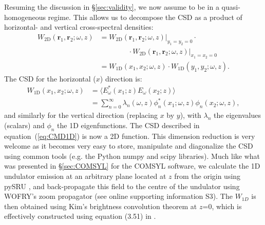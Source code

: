 \documentclass[preprint]{iucr}
\newcommand{\inred}[1]{{\color{red}#1}}
\begin{document}
Resuming the discussion in \S\ref{sec:validity}, we now assume to be in a quasi-homogeneous regime. This allow\inred{s} us to decompose the CSD as a product of horizontal- and vertical cross-spectral densities:
\begin{equation}\label{eq:CSD_2D_bis}
\begin{split}
W_\text{2D}(\textbf{r}_1,\textbf{r}_2;\omega,z) &= W_\text{2D}(\textbf{r}_1,\textbf{r}_2;\omega,z)\Big\rvert_{y_1=y_2=0} \cdot \\& \qquad\qquad\cdot W_\text{2D}(\textbf{r}_1,\textbf{r}_2;\omega,z)\Big\rvert_{x_1=x_2=0}\\
&= W_\text{1D}(x_1,x_2;\omega,z)\cdot W_\text{1D}(y_1,y_2;\omega,z).
\end{split}
\end{equation}
The CSD for the horizontal ($x$) direction is:
\begin{equation}\begin{split}
W_\text{1D}(x_1,x_2;\omega,z) &= \big\langle E^*_{\omega}(x_1;z) E_{\omega}(x_2;z)\big\rangle \\&=  \sum_{n=0}^{\infty} \lambda_n(\omega,z) \phi_n^*(x_1;\omega,z) \phi_n(x_2;\omega,z), 
\end{split}\label{eq:CMD1D}
\end{equation}
and similarly for the vertical direction (replacing $x$ by $y$), 
with $\lambda_n$ the eigenvalues (scalars) and $\phi_n$ the 1D eigenfunctions. The CSD described in equation~(\ref{eq:CMD1D}) is now a 2D function. This \inred{ dimension reduction} is very welcome as it becomes very easy to store, manipulate and diagonalize the CSD using common tools (e.g. the Python numpy and scipy libraries). Much like what was presented in \S\ref{sec:COMSYL} for the COMSYL software,  we calculate the 1D undulator emission at an arbitrary plane located at $z$ from the origin using pySRU \cite{pySRU}, and back-propagate this field to the \inred{centre} of the undulator using WOFRY's zoom propagator (see \inred{online supporting information S3}). The $W_{1D}$ is then obtained using Kim's brightness convolution theorem at $z$=0, which is effectively constructed using equation (3.51) in \cite{glassThesis}.
\end{document}

